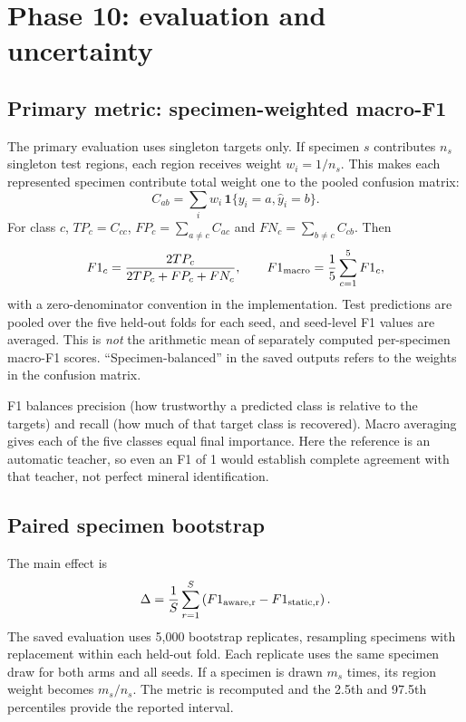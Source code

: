 \section{Phase 10: evaluation and uncertainty}
\subsection{Primary metric: specimen-weighted macro-F1}
The primary evaluation uses singleton targets only. If specimen $s$ contributes $n_s$ singleton test regions, each region receives weight $w_i=1/n_s$. This makes each represented specimen contribute total weight one to the pooled confusion matrix:
\begin{equation}
C_{ab}=\sum_iw_i\,\mathbf1\{y_i=a,\widehat y_i=b\}.
\end{equation}
For class $c$, $TP_c=C_{cc}$, $FP_c=\sum_{a\ne c}C_{ac}$ and $FN_c=\sum_{b\ne c}C_{cb}$. Then
\begin{equation}
F1_c=\frac{2TP_c}{2TP_c+FP_c+FN_c},\qquad
F1_{\rm macro}=\frac15\sum_{c=1}^{5}F1_c,
\end{equation}
with a zero-denominator convention in the implementation. Test predictions are pooled over the five held-out folds for each seed, and seed-level F1 values are averaged. This is \emph{not} the arithmetic mean of separately computed per-specimen macro-F1 scores. ``Specimen-balanced'' in the saved outputs refers to the weights in the confusion matrix.

F1 balances precision (how trustworthy a predicted class is relative to the targets) and recall (how much of that target class is recovered). Macro averaging gives each of the five classes equal final importance. Here the reference is an automatic teacher, so even an F1 of 1 would establish complete agreement with that teacher, not perfect mineral identification.

\subsection{Paired specimen bootstrap}
The main effect is
\begin{equation}
\Delta=\frac1{S}\sum_{r=1}^{S}
\left(F1_{\rm aware,r}-F1_{\rm static,r}\right).
\end{equation}
The saved evaluation uses 5,000 bootstrap replicates, resampling specimens with replacement within each held-out fold. Each replicate uses the same specimen draw for both arms and all seeds. If a specimen is drawn $m_s$ times, its region weight becomes $m_s/n_s$. The metric is recomputed and the 2.5th and 97.5th percentiles provide the reported interval.

